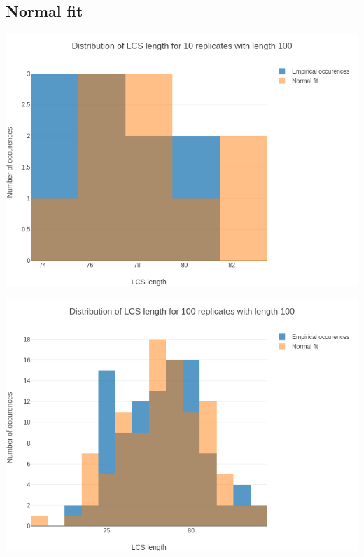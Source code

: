 \documentclass{beamer}
\begin{document}
\subsection{Normal fit}
\begin{frame}
  \includegraphics[width=\textwidth]{img/comparison_normal_rep10.png}
\end{frame}

\begin{frame}
  \includegraphics[width=\textwidth]{img/comparison_normal_rep100.png}
\end{frame}
\end{document}
